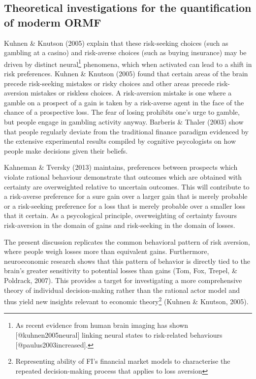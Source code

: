 \documentclass{DissertateUSU}
\begin{document}
\subsection{Theoretical investigations for the quantification of moderm ORMF}

Kuhnen \& Knutson (2005) explain that these risk-seeking choices (such
as gambling at a casino) and risk-averse choices (such as buying
insurance) may be driven by distinct
neural\footnote{As recent evidence from human brain imaging has shown [@kuhnen2005neural] linking neural states to risk-related behaviours [@paulus2003increased].}
phenomena, which when activated can lead to a shift in risk preferences.
Kuhnen \& Knutson (2005) found that certain areas of the brain precede
risk-seeking mistakes or risky choices and other areas precede
risk-aversion mistakes or riskless choices. A risk-aversion mistake is
one where a gamble on a prospect of a gain is taken by a risk-averse
agent in the face of the chance of a prospective loss. The fear of
losing prohibits one's urge to gamble, but people engage in gambling
activity anyway. Barberis \& Thaler (2003) show that people regularly
deviate from the traditional finance paradigm evidenced by the extensive
experimental results compiled by cognitive psycologists on how people
make decisions given their beliefs.\medskip 

Kahneman \& Tversky (2013) maintains, preferences between prospects
which violate rational behaviour demonstrate that outcomes which are
obtained with certainty are overweighted relative to uncertain outcomes.
This will contribute to a risk-averse preference for a sure gain over a
larger gain that is merely probable or a risk-seeking preference for a
loss that is merely probable over a smaller loss that it certain. As a
psycological principle, overweighting of certainty favours risk-aversion
in the domain of gains and risk-seeking in the domain of losses.\medskip

The present discussion replicates the common behavioral pattern of risk
aversion, where people weigh losses more than equivalent gains.
Furthermore, neuroeconomic research shows that this pattern of behavior
is directly tied to the brain's greater sensitivity to potential losses
than gains (Tom, Fox, Trepel, \& Poldrack, 2007). This provides a target
for investigating a more comprehensive theory of individual
decision-making rather than the rational actor model and thus yield new
insights relevant to economic
theory\footnote{Representing ability of FI's financial market models to characterise the repeated decision-making process that applies to loss aversion}
(Kuhnen \& Knutson, 2005).\medskip  
\end{document}
